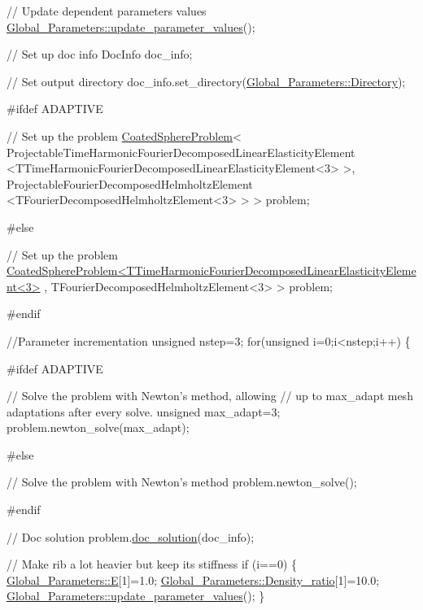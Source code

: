 \begin{DoxyCodeInclude}
{{{{{{ \textcolor{comment}{// Update dependent parameters values}
 \hyperlink{namespaceGlobal__Parameters_ae0f9a80fb7510dbfbbef22582da231b7}{Global\_Parameters::update\_parameter\_values}();

 \textcolor{comment}{// Set up doc info}
 DocInfo doc\_info;
 
 \textcolor{comment}{// Set output directory}
 doc\_info.set\_directory(\hyperlink{namespaceGlobal__Parameters_a301ab922df72030c660b21328d6caf76}{Global\_Parameters::Directory});
 
\textcolor{preprocessor}{#ifdef ADAPTIVE}

 \textcolor{comment}{// Set up the problem}
 \hyperlink{classCoatedSphereProblem}{CoatedSphereProblem}<
  ProjectableTimeHarmonicFourierDecomposedLinearElasticityElement
  <TTimeHarmonicFourierDecomposedLinearElasticityElement<3> >,
  ProjectableFourierDecomposedHelmholtzElement
  <TFourierDecomposedHelmholtzElement<3> > > problem;

\textcolor{preprocessor}{#else}

 \textcolor{comment}{// Set up the problem}
 \hyperlink{classCoatedSphereProblem}{CoatedSphereProblem<TTimeHarmonicFourierDecomposedLinearElasticityElement<3>}
      ,
                     TFourierDecomposedHelmholtzElement<3> > problem;

\textcolor{preprocessor}{#endif}


 \textcolor{comment}{//Parameter incrementation}
 \textcolor{keywordtype}{unsigned} nstep=3;
 \textcolor{keywordflow}{for}(\textcolor{keywordtype}{unsigned} i=0;i<nstep;i++)
  \{

\textcolor{preprocessor}{#ifdef ADAPTIVE}

   \textcolor{comment}{// Solve the problem with Newton's method, allowing}
   \textcolor{comment}{// up to max\_adapt mesh adaptations after every solve.}
   \textcolor{keywordtype}{unsigned} max\_adapt=3;
   problem.newton\_solve(max\_adapt);

\textcolor{preprocessor}{#else}

   \textcolor{comment}{// Solve the problem with Newton's method}
   problem.newton\_solve();

\textcolor{preprocessor}{#endif}

   \textcolor{comment}{// Doc solution}
   problem.\hyperlink{classCoatedSphereProblem_aaeade2a110160c002b2b45954a5a0edc}{doc\_solution}(doc\_info);

   \textcolor{comment}{// Make rib a lot heavier but keep its stiffness}
   \textcolor{keywordflow}{if} (i==0)
    \{
     \hyperlink{namespaceGlobal__Parameters_aa961bcca2115ce9cb37cc8ccb1b90cae}{Global\_Parameters::E}[1]=1.0;
     \hyperlink{namespaceGlobal__Parameters_a517d4c31b8bce6563c2f605266dd9679}{Global\_Parameters::Density\_ratio}[1]=10.0; 
     \hyperlink{namespaceGlobal__Parameters_ae0f9a80fb7510dbfbbef22582da231b7}{Global\_Parameters::update\_parameter\_values}();
    \}

}}}}}}
\end{DoxyCodeInclude}
